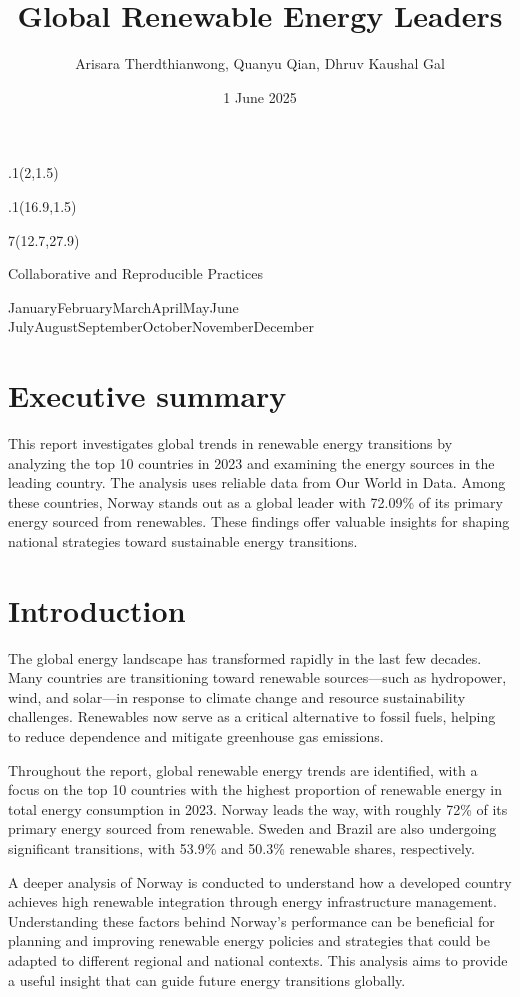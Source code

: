 \documentclass[
  11pt,
  a4paper,
]{article}
\title{Global Renewable Energy Leaders}
\date{1 June 2025}
\author{Arisara Therdthianwong, Quanyu Qian, Dhruv Kaushal Gal}
\makeatletter
\renewcommand*\contentsname{Table of contents}
\newcommand\contentsname{Table of contents}
\def\placefig#1#2#3#4{\begin{textblock}{.1}(#1,#2)\rlap{\texttt{[image: \#4]}}\end{textblock}}
\def\Month{\ifcase\month\or
 January\or February\or March\or April\or May\or June\or
 July\or August\or September\or October\or November\or December\fi}
\def\Year{\number\year}
\def\cover{{\sffamily\setcounter{page}{0}
        \thispagestyle{empty}
        \placefig{2}{1.5}{width=5cm}{monash2}
        \placefig{16.9}{1.5}{width=2.1cm}{MBSportrait}
        \begin{textblock}{7}(12.7,27.9)\hfill
        \end{textblock}
        \vspace*{2.5cm}
        \begin{center}\Large
        Collaborative and Reproducible Practices \\[.5cm]
        \end{center}\vspace{2cm}
        \begin{center}
        \fbox{\parbox{14cm}{\begin{onehalfspace}\centering\Huge\vspace*{0.3cm}
                \textsf{\textbf{\expandafter{\@title}}}\vspace{1cm}\par
                \LARGE
                \expandafter{\@author}
                \end{onehalfspace}
        }}
        \end{center}
        \vfill
                \begin{center}\Large
                \Month~\Year\\[1cm]
        \end{center}\vspace*{2cm}}}
\def\titlepage{{\cover\newpage}}
\let\maketitle\titlepage
\makeatother
\begin{document}
\maketitle


  
\renewcommand*\contentsname{Table of contents}
{
\hypersetup{linkcolor=}
\setcounter{tocdepth}{3}
\tableofcontents
}

\newpage

\section{Executive summary}\label{executive-summary}

This report investigates global trends in renewable energy transitions
by analyzing the top 10 countries in 2023 and examining the energy
sources in the leading country. The analysis uses reliable data from Our
World in Data. Among these countries, Norway stands out as a global
leader with 72.09\% of its primary energy sourced from renewables. These
findings offer valuable insights for shaping national strategies toward
sustainable energy transitions.

\newpage

\section{Introduction}\label{introduction}

The global energy landscape has transformed rapidly in the last few
decades. Many countries are transitioning toward renewable
sources---such as hydropower, wind, and solar---in response to climate
change and resource sustainability challenges. Renewables now serve as a
critical alternative to fossil fuels, helping to reduce dependence and
mitigate greenhouse gas emissions.

Throughout the report, global renewable energy trends are identified,
with a focus on the top 10 countries with the highest proportion of
renewable energy in total energy consumption in 2023. Norway leads the
way, with roughly 72\% of its primary energy sourced from renewable.
Sweden and Brazil are also undergoing significant transitions, with
53.9\% and 50.3\% renewable shares, respectively.

A deeper analysis of Norway is conducted to understand how a developed
country achieves high renewable integration through energy
infrastructure management. Understanding these factors behind Norway's
performance can be beneficial for planning and improving renewable
energy policies and strategies that could be adapted to different
regional and national contexts. This analysis aims to provide a useful
insight that can guide future energy transitions globally.
\end{document}
